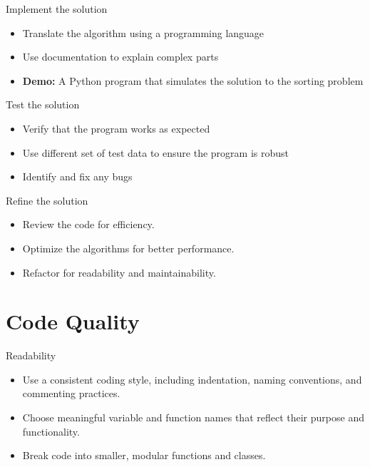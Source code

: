 \documentclass[sectionframe]{oxblue-beamer}
\begin{document}
\begin{frame}{Implement the solution}
\begin{itemize}
    \item Translate the algorithm using a programming language
    \item Use documentation to explain complex parts
    \item \textbf{Demo:} A Python program that simulates the solution to the sorting problem
\end{itemize}
\end{frame}

\begin{frame}{Test the solution}
\begin{itemize}
    \item Verify that the program works as expected
    \item Use different set of test data to ensure the program is robust
    \item Identify and fix any bugs
\end{itemize}
\end{frame}

\begin{frame}{Refine the solution}
\begin{itemize}
    \item Review the code for efficiency.
    \item Optimize the algorithms for better performance.
    \item Refactor for readability and maintainability.
\end{itemize}
\end{frame}

\section{Code Quality}

\begin{frame}{Readability}
\begin{itemize}
    \item Use a consistent coding style, including indentation, naming conventions, and commenting practices.
    \item Choose meaningful variable and function names that reflect their purpose and functionality.
    \item Break code into smaller, modular functions and classes.
\end{itemize}
\end{frame}
\end{document}
